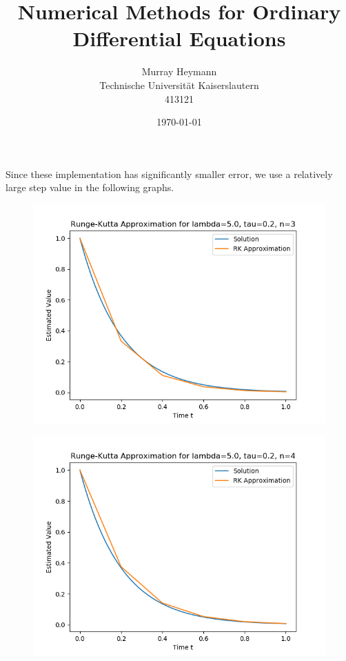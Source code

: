 \documentclass{article}
\title{Numerical Methods for Ordinary Differential Equations}
\author{Murray Heymann \\
	Technische Universit{\"a}t Kaiserslautern \\
	413121}
\date{\today}
\begin{document}
\maketitle


\setcounter{section}{1}
\section{}
\subsection{}
Since these implementation has significantly smaller error, we use a relatively
large step value in the following graphs.
\begin{figure}[H]
	\includegraphics[scale=0.6]{RK3_02_5}
\end{figure}
\begin{figure}[H]
	\includegraphics[scale=0.6]{RK4_02_5}
\end{figure}
\end{document}
